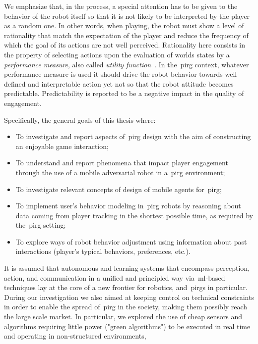 We emphasize that, in the process, a special attention has to be given to the behavior of the robot itself so that it is not likely to be interpreted by the player as a random one. In other words, when playing, the robot must show a level of rationality that match the expectation of the player and reduce the frequency of which the goal of its actions are not well perceived. Rationality here consists in the property of selecting actions upon the evaluation of worlds states by a \textit{performance measure}, also called \textit{utility function}~\citep{russell_artificial_2009}. In the~\gls{pirg} context, whatever performance measure is used it should drive the robot behavior towards well defined and interpretable action yet not so that the robot attitude becomes predictable. Predictability is reported to be a negative impact in the quality of engagement.   

Specifically, the general goals of this thesis where:

\begin{itemize}
\item To investigate and report aspects of~\gls{pirg} design with the aim of constructing an enjoyable game interaction; 
\item To understand and report phenomena that impact player engagement through the use of a mobile adversarial robot in a~\gls{pirg} environment;
\item To investigate relevant concepts of design of mobile agents for~\gls{pirg};
\item To implement user's behavior modeling in~\gls{pirg} robots by reasoning about data coming from player tracking in the shortest possible time, as required by the~\gls{pirg} setting;
\item To explore ways of robot behavior adjustment using information about past interactions (player's typical behaviors, preferences, etc.).
\end{itemize}

It is assumed that autonomous and learning systems that encompass perception, action, and communication in a unified and principled way via~\gls{ml}-based techniques lay at the core of a new frontier for robotics, and~\gls{pirg}s in particular. During our investigation we also aimed at keeping control on technical constraints in order to enable the spread of~\gls{pirg} in the society, making them possibly reach the large scale market. In particular, we explored the use of cheap sensors and algorithms requiring little power ("green algorithms") to be executed in real time and operating in non-structured environments, 

